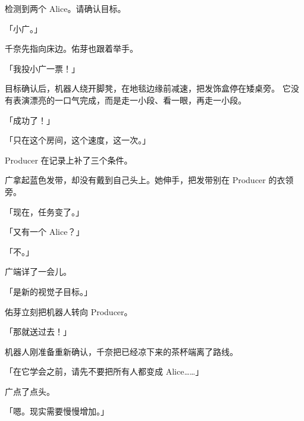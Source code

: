 \begin{center}
检测到两个 Alice。请确认目标。
\end{center}

「小广。」

千奈先指向床边。佑芽也跟着举手。

「我投小广一票！」

目标确认后，机器人绕开脚凳，在地毯边缘前减速，把发饰盒停在矮桌旁。
它没有表演漂亮的一口气完成，而是走一小段、看一眼，再走一小段。

「成功了！」

「只在这个房间，这个速度，这一次。」

Producer 在记录上补了三个条件。

广拿起蓝色发带，却没有戴到自己头上。她伸手，把发带别在 Producer 的衣领旁。

「现在，任务变了。」

「又有一个 Alice？」

「不。」

广端详了一会儿。

「是新的视觉子目标。」

佑芽立刻把机器人转向 Producer。

「那就送过去！」

机器人刚准备重新确认，千奈把已经凉下来的茶杯端离了路线。

「在它学会之前，请先不要把所有人都变成 Alice……」

广点了点头。

「嗯。现实需要慢慢增加。」

